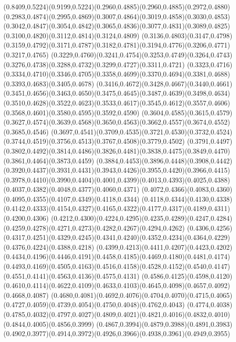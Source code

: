 \PST@Solid(0.8409,0.5224)(0.9199,0.5224)\PST@Solid(0.2960,0.4885)(0.2960,0.4885)(0.2972,0.4880)(0.2983,0.4874)(0.2995,0.4869)(0.3007,0.4864)(0.3019,0.4858)(0.3030,0.4853)
(0.3042,0.4847)(0.3054,0.4842)(0.3065,0.4836)(0.3077,0.4831)(0.3089,0.4825)(0.3100,0.4820)(0.3112,0.4814)(0.3124,0.4809)
(0.3136,0.4803)(0.3147,0.4798)(0.3159,0.4792)(0.3171,0.4787)(0.3182,0.4781)(0.3194,0.4776)(0.3206,0.4771)(0.3217,0.4765)
(0.3229,0.4760)(0.3241,0.4754)(0.3253,0.4749)(0.3264,0.4743)(0.3276,0.4738)(0.3288,0.4732)(0.3299,0.4727)(0.3311,0.4721)
(0.3323,0.4716)(0.3334,0.4710)(0.3346,0.4705)(0.3358,0.4699)(0.3370,0.4694)(0.3381,0.4688)(0.3393,0.4683)(0.3405,0.4678)
(0.3416,0.4672)(0.3428,0.4667)(0.3440,0.4661)(0.3451,0.4656)(0.3463,0.4650)(0.3475,0.4645)(0.3487,0.4639)(0.3498,0.4634)
(0.3510,0.4628)(0.3522,0.4623)(0.3533,0.4617)(0.3545,0.4612)(0.3557,0.4606)(0.3568,0.4601)(0.3580,0.4595)(0.3592,0.4590)
(0.3604,0.4585)(0.3615,0.4579)(0.3627,0.4574)(0.3639,0.4568)(0.3650,0.4563)(0.3662,0.4557)(0.3674,0.4552)(0.3685,0.4546)
(0.3697,0.4541)(0.3709,0.4535)(0.3721,0.4530)(0.3732,0.4524)(0.3744,0.4519)(0.3756,0.4513)(0.3767,0.4508)(0.3779,0.4502)
(0.3791,0.4497)(0.3802,0.4492)(0.3814,0.4486)(0.3826,0.4481)(0.3838,0.4475)(0.3849,0.4470)(0.3861,0.4464)(0.3873,0.4459)
(0.3884,0.4453)(0.3896,0.4448)(0.3908,0.4442)(0.3920,0.4437)(0.3931,0.4431)(0.3943,0.4426)(0.3955,0.4420)(0.3966,0.4415)
(0.3978,0.4410)(0.3990,0.4404)(0.4001,0.4399)(0.4013,0.4393)(0.4025,0.4388)(0.4037,0.4382)(0.4048,0.4377)(0.4060,0.4371)
(0.4072,0.4366)(0.4083,0.4360)(0.4095,0.4355)(0.4107,0.4349)(0.4118,0.4344)
\PST@Solid(0.4118,0.4344)(0.4130,0.4338)(0.4142,0.4333)(0.4154,0.4327)(0.4165,0.4322)(0.4177,0.4317)(0.4189,0.4311)(0.4200,0.4306)
(0.4212,0.4300)(0.4224,0.4295)(0.4235,0.4289)(0.4247,0.4284)(0.4259,0.4278)(0.4271,0.4273)(0.4282,0.4267)(0.4294,0.4262)
(0.4306,0.4256)(0.4317,0.4251)(0.4329,0.4245)(0.4341,0.4240)(0.4352,0.4234)(0.4364,0.4229)(0.4376,0.4224)(0.4388,0.4218)
(0.4399,0.4213)(0.4411,0.4207)(0.4423,0.4202)(0.4434,0.4196)(0.4446,0.4191)(0.4458,0.4185)(0.4469,0.4180)(0.4481,0.4174)
(0.4493,0.4169)(0.4505,0.4163)(0.4516,0.4158)(0.4528,0.4152)(0.4540,0.4147)(0.4551,0.4141)(0.4563,0.4136)(0.4575,0.4131)
(0.4586,0.4125)(0.4598,0.4120)(0.4610,0.4114)(0.4622,0.4109)(0.4633,0.4103)(0.4645,0.4098)(0.4657,0.4092)(0.4668,0.4087)
(0.4680,0.4081)(0.4692,0.4076)(0.4704,0.4070)(0.4715,0.4065)(0.4727,0.4059)(0.4739,0.4054)(0.4750,0.4048)(0.4762,0.4043)
(0.4774,0.4038)(0.4785,0.4032)(0.4797,0.4027)(0.4809,0.4021)(0.4821,0.4016)(0.4832,0.4010)(0.4844,0.4005)(0.4856,0.3999)
(0.4867,0.3994)(0.4879,0.3988)(0.4891,0.3983)(0.4902,0.3977)(0.4914,0.3972)(0.4926,0.3966)(0.4938,0.3961)(0.4949,0.3955)
